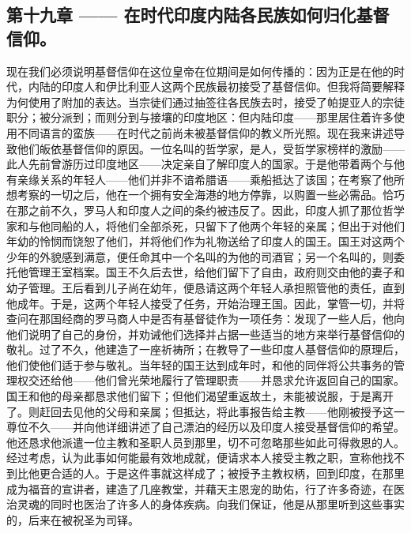 \subsection{第十九章 —— 在时代印度内陆各民族如何归化基督信仰。}

现在我们必须说明基督信仰在这位皇帝在位期间是如何传播的：因为正是在他的时代，内陆的印度人和伊比利亚人这两个民族最初接受了基督信仰。但我将简要解释为何使用了附加的表达。当宗徒们通过抽签往各民族去时，接受了帕提亚人的宗徒职分；被分派到；而则分到与接壤的印度地区：但内陆印度——那里居住着许多使用不同语言的蛮族——在时代之前尚未被基督信仰的教义所光照。现在我来讲述导致他们皈依基督信仰的原因。一位名叫的哲学家，是人，受哲学家榜样的激励——此人先前曾游历过印度地区——决定亲自了解印度人的国家。于是他带着两个与他有亲缘关系的年轻人——他们并非不谙希腊语——乘船抵达了该国；在考察了他所想考察的一切之后，他在一个拥有安全海港的地方停靠，以购置一些必需品。恰巧在那之前不久，罗马人和印度人之间的条约被违反了。因此，印度人抓了那位哲学家和与他同船的人，将他们全部杀死，只留下了他两个年轻的亲属；但出于对他们年幼的怜悯而饶恕了他们，并将他们作为礼物送给了印度人的国王。国王对这两个少年的外貌感到满意，便任命其中一个名叫的为他的司酒官；另一个名叫的，则委托他管理王室档案。国王不久后去世，给他们留下了自由，政府则交由他的妻子和幼子管理。王后看到儿子尚在幼年，便恳请这两个年轻人承担照管他的责任，直到他成年。于是，这两个年轻人接受了任务，开始治理王国。因此，掌管一切，并将查问在那国经商的罗马商人中是否有基督徒作为一项任务：发现了一些人后，他向他们说明了自己的身份，并劝诫他们选择并占据一些适当的地方来举行基督信仰的敬礼。过了不久，他建造了一座祈祷所；在教导了一些印度人基督信仰的原理后，他们使他们适于参与敬礼。当年轻的国王达到成年时，和他的同伴将公共事务的管理权交还给他——他们曾光荣地履行了管理职责——并恳求允许返回自己的国家。国王和他的母亲都恳求他们留下；但他们渴望重返故土，未能被说服，于是离开了。则赶回去见他的父母和亲属；但抵达，将此事报告给主教——他刚被授予这一尊位不久——并向他详细讲述了自己漂泊的经历以及印度人接受基督信仰的希望。他还恳求他派遣一位主教和圣职人员到那里，切不可忽略那些如此可得救恩的人。经过考虑，认为此事如何能最有效地成就，便请求本人接受主教之职，宣称他找不到比他更合适的人。于是这件事就这样成了；被授予主教权柄，回到印度，在那里成为福音的宣讲者，建造了几座教堂，并藉天主恩宠的助佑，行了许多奇迹，在医治灵魂的同时也医治了许多人的身体疾病。向我们保证，他是从那里听到这些事实的，后来在被祝圣为司铎。\par

